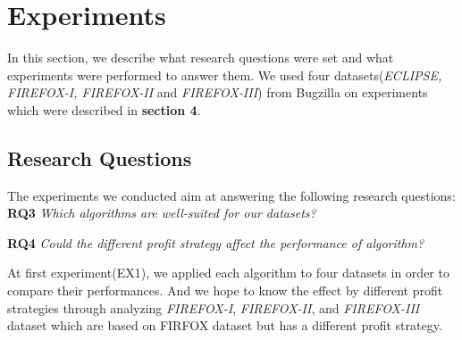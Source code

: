 





\section{Experiments}
In this section, we describe what research questions were set and what experiments were performed to answer them. We used four datasets(\textit{ECLIPSE, FIREFOX-I, FIREFOX-II} and \textit{FIREFOX-III}) from Bugzilla on experiments which were described in \textbf{section 4}.

\subsection{Research Questions}

The experiments we conducted aim at answering the following research questions:\\
 
\textbf{RQ3} \textit{Which algorithms are well-suited for our datasets?}

\textbf{RQ4} \textit{Could the different profit strategy affect the performance of algorithm?}

At first experiment(EX1), we applied each algorithm to four datasets in order to compare their performances. And we hope to know the effect by different profit strategies through analyzing \textit{FIREFOX-I}, \textit{FIREFOX-II}, and \textit{FIREFOX-III} dataset which are based on FIRFOX dataset but has a different profit strategy.\\

